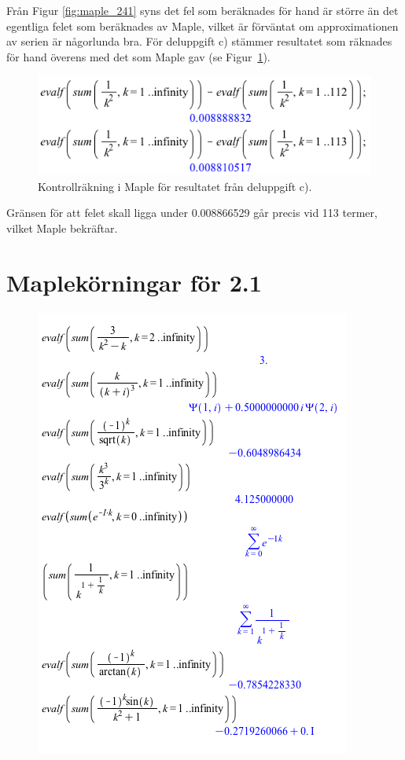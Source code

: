 \documentclass[a4paper]{article}
\begin{document}
\noindent Från Figur \ref{fig:maple_241} syns det fel som beräknades för hand är större än det egentliga felet som beräknades av Maple, vilket är förväntat om approximationen av serien är någorlunda bra.
För deluppgift c) stämmer resultatet som räknades för hand överens med det som Maple gav (se Figur \ref{fig:maple_242}).

\begin{figure}[h!]
	\centering
	\includegraphics[width=0.63\linewidth]{maple_242.png}
	\caption{Kontrollräkning i Maple för resultatet från deluppgift c).}
	\label{fig:maple_242}
\end{figure}

\noindent Gränsen för att felet skall ligga under 0.008866529 går precis vid 113 termer, vilket Maple bekräftar.

\newpage
\appendix
\section{Maplekörningar för 2.1}\label{ap:maple}
\begin{figure}[h!]
	\centering
	\includegraphics[width=\linewidth]{maple_1.png}
\end{figure}
\end{document}
